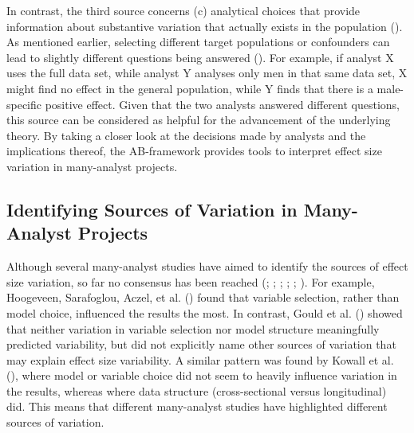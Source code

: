 \documentclass[
  man,
  floatsintext,
  longtable,
  nolmodern,
  notxfonts,
  notimes,
  colorlinks=true,linkcolor=blue,citecolor=blue,urlcolor=blue]{apa7}
\begin{document}
In contrast, the third source concerns (c) analytical choices that
provide information about substantive variation that actually exists in
the population (). As mentioned earlier, selecting different target populations or
confounders can lead to slightly different questions being answered
().
For example, if analyst X uses the full data set, while analyst Y
analyses only men in that same data set, X might find no effect in the
general population, while Y finds that there is a male-specific positive
effect. Given that the two analysts answered different questions, this
source can be considered as helpful for the advancement of the
underlying theory. By taking a closer look at the decisions made by
analysts and the implications thereof, the AB-framework provides tools
to interpret effect size variation in many-analyst projects.

\subsection{Identifying Sources of Variation in Many-Analyst
Projects}\label{identifying-sources-of-variation-in-many-analyst-projects}

Although several many-analyst studies have aimed to identify the sources
of effect size variation, so far no consensus has been reached
(;
;
;
; ; ).
For example, Hoogeveen, Sarafoglou, Aczel, et al.
() found that variable
selection, rather than model choice, influenced the results the most. In
contrast, Gould et al. () showed
that neither variation in variable selection nor model structure
meaningfully predicted variability, but did not explicitly name other
sources of variation that may explain effect size variability. A similar
pattern was found by Kowall et al.
(), where model or variable
choice did not seem to heavily influence variation in the results,
whereas where data structure (cross-sectional versus longitudinal) did.
This means that different many-analyst studies have highlighted
different sources of variation.
\end{document}

